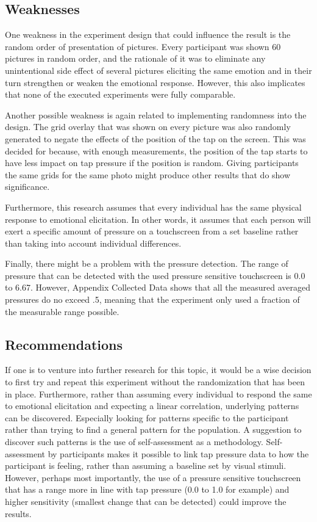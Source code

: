 \documentclass{sigchi}
\begin{document}
\subsection{Weaknesses}
One weakness in the experiment design that could influence the result is the random order of presentation of pictures. Every participant was shown 60 pictures in random order, and the rationale of it was to eliminate any unintentional side effect of several pictures eliciting the same emotion and in their turn strengthen or weaken the emotional response. However, this also implicates that none of the executed experiments were fully comparable.

Another possible weakness is again related to implementing randomness into the design. The grid overlay that was shown on every picture was also randomly generated to negate the effects of the position of the tap on the screen. This was decided for because, with enough measurements, the position of the tap starts to have less impact on tap pressure if the position is random. Giving participants the same grids for the same photo might produce other results that do show significance.

Furthermore, this research assumes that every individual has the same physical response to emotional elicitation. In other words, it assumes that each person will exert a specific amount of pressure on a touchscreen from a set baseline rather than taking into account individual differences.

Finally, there might be a problem with the pressure detection. The range of pressure that can be detected with the used pressure sensitive touchscreen is 0.0 to 6.67. However, Appendix Collected Data shows that all the measured averaged pressures do no exceed .5, meaning that the experiment only used a fraction of the measurable range possible.

\subsection{Recommendations} %
\label{sub:recommendations}
If one is to venture into further research for this topic, it would be a wise decision to first try and repeat this experiment without the randomization that has been in place. Furthermore, rather than assuming every individual to respond the same to emotional elicitation and expecting a linear correlation, underlying patterns can be discovered. Especially looking for patterns specific to the participant rather than trying to find a general pattern for the population. A suggestion to discover such patterns is the use of self-assessment as a methodology. Self-assessment by participants makes it possible to link tap pressure data to how the participant is feeling, rather than assuming a baseline set by visual stimuli. However, perhaps most importantly, the use of a pressure sensitive touchscreen that has a range more in line with tap pressure (0.0 to 1.0 for example) and higher sensitivity (smallest change that can be detected) could improve the results.
\end{document}
